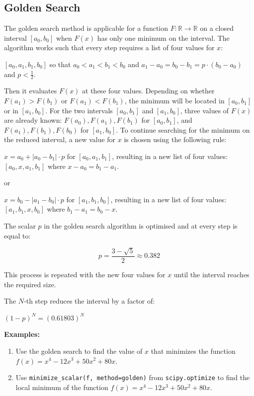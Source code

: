 \documentclass[11pt]{article}
\begin{document}
    \newpage

\subsection{Golden Search}\label{golden-search}

The golden search method is applicable for a function
\(F: \mathbb{R} \to \mathbb{R}\) on a closed interval \([a_0, b_0]\)
when \(F(x)\) has only one minimum on the interval. The algorithm works
such that every step requires a list of four values for \(x\):

\([a_0, a_1, b_1, b_0]\) so that \(a_0 < a_1 < b_1 < b_0\) and
\(a_1 - a_0 = b_0 - b_1 = p \cdot (b_0 - a_0)\) and \(p < \frac{1}{2}\).

Then it evaluates \(F(x)\) at these four values. Depending on whether
\(F(a_1) > F(b_1)\) or \(F(a_1) < F(b_1)\), the minimum will be located
in \([a_0, b_1]\) or in \([a_1, b_0]\). For the two intervals
\([a_0, b_1]\) and \([a_1, b_0]\), three values of \(F(x)\) are already
known: \(F(a_0), F(a_1), F(b_1)\) for \([a_0, b_1]\), and
\(F(a_1), F(b_1), F(b_0)\) for \([a_1, b_0]\). To continue searching for
the minimum on the reduced interval, a new value for \(x\) is chosen
using the following rule:

\(x = a_0 + |a_0 - b_1| \cdot p\) for \([a_0, a_1, b_1]\), resulting in
a new list of four values: \([a_0, x, a_1, b_1]\) where
\(x - a_0 = b_1 - a_1\).

or

\(x = b_0 - |a_1 - b_0| \cdot p\) for \([a_1, b_1, b_0]\), resulting in
a new list of four values: \([a_1, b_1, x, b_0]\) where
\(b_1 - a_1 = b_0 - x\).

The scalar \(p\) in the golden search algorithm is optimised and at
every step is equal to:

\[p = \frac{3 - \sqrt{5}}{2} \approx 0.382\]

This process is repeated with the new four values for \(x\) until the
interval reaches the required size.

The \(N\)-th step reduces the interval by a factor of:

\((1 - p)^N = (0.61803)^N\)

\textbf{Examples:}

\begin{enumerate}
\def\labelenumi{\arabic{enumi}.}
\item
  Use the golden search to find the value of \(x\) that minimizes the
  function \(f(x) = x^4 - 12x^3 + 50x^2 + 80x\).
\item
  Use
  \texttt{minimize\_scalar(f,\ method=\textquotesingle{}golden\textquotesingle{})}
  from \texttt{scipy.optimize} to find the local minimum of the function
  \(f(x) = x^4 - 12x^3 + 50x^2 + 80x\).
\end{enumerate}
\end{document}
